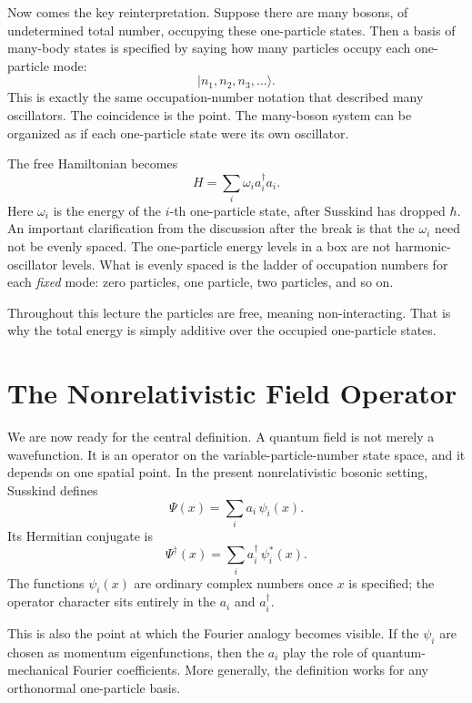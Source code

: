 Now comes the key reinterpretation. Suppose there are many bosons, of undetermined total number, occupying these one-particle states. Then a basis of many-body states is specified by saying how many particles occupy each one-particle mode:
\begin{equation}
|n_1,n_2,n_3,\ldots\rangle.
\end{equation}
This is exactly the same occupation-number notation that described many oscillators. The coincidence is the point. The many-boson system can be organized as if each one-particle state were its own oscillator.

The free Hamiltonian becomes
\begin{equation}
H = \sum_i \omega_i a_i^\dagger a_i.
\end{equation}
Here \(\omega_i\) is the energy of the \(i\)-th one-particle state, after Susskind has dropped \(\hbar\). An important clarification from the discussion after the break is that the \(\omega_i\) need not be evenly spaced. The one-particle energy levels in a box are not harmonic-oscillator levels. What is evenly spaced is the ladder of occupation numbers for each \emph{fixed} mode: zero particles, one particle, two particles, and so on.

Throughout this lecture the particles are free, meaning non-interacting. That is why the total energy is simply additive over the occupied one-particle states.

\section{The Nonrelativistic Field Operator}

We are now ready for the central definition. A quantum field is not merely a wavefunction. It is an operator on the variable-particle-number state space, and it depends on one spatial point. In the present nonrelativistic bosonic setting, Susskind defines
\begin{equation}
\Psi(x)=\sum_i a_i\,\psi_i(x).
\end{equation}
Its Hermitian conjugate is
\begin{equation}
\Psi^\dagger(x)=\sum_i a_i^\dagger\,\psi_i^*(x).
\end{equation}
The functions \(\psi_i(x)\) are ordinary complex numbers once \(x\) is specified; the operator character sits entirely in the \(a_i\) and \(a_i^\dagger\).

This is also the point at which the Fourier analogy becomes visible. If the \(\psi_i\) are chosen as momentum eigenfunctions, then the \(a_i\) play the role of quantum-mechanical Fourier coefficients. More generally, the definition works for any orthonormal one-particle basis.

